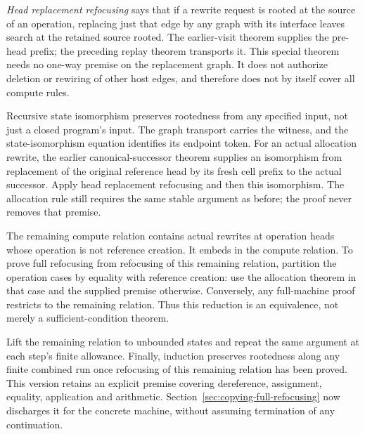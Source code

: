 
\emph{Head replacement refocusing} says that if a rewrite request is rooted
at the source of an operation, replacing just that edge by any graph with its
interface leaves search at the retained source rooted. The earlier-visit
theorem supplies the pre-head prefix; the preceding replay theorem transports
it. This special theorem needs no one-way premise on the replacement graph.
It does not authorize deletion or rewiring of other host edges, and therefore
does not by itself cover all compute rules.


Recursive state isomorphism preserves rootedness from any specified input,
not just a closed program's input. The graph transport carries the witness,
and the state-isomorphism equation identifies its endpoint token. For an
actual allocation rewrite, the earlier canonical-successor theorem supplies
an isomorphism from replacement of the original reference head by its fresh
cell prefix to the actual successor. Apply head replacement refocusing and
then this isomorphism. The allocation rule still requires the same stable
argument as before; the proof never removes that premise.



The remaining compute relation contains actual rewrites at operation heads
whose operation is not reference creation. It embeds in the compute relation.
To prove full refocusing from refocusing of this remaining relation, partition
the operation cases by equality with reference creation: use the allocation
theorem in that case and the supplied premise otherwise. Conversely, any
full-machine proof restricts to the remaining relation. Thus this reduction
is an equivalence, not merely a sufficient-condition theorem.




Lift the remaining relation to unbounded states and repeat the same
argument at each step's finite allowance. Finally, induction preserves
rootedness along any finite combined run once refocusing of this remaining
relation has been proved. This version retains an explicit premise covering dereference, assignment,
equality, application and arithmetic. Section~\ref{sec:copying-full-refocusing}
now discharges it for the concrete machine, without assuming termination
of any continuation.

